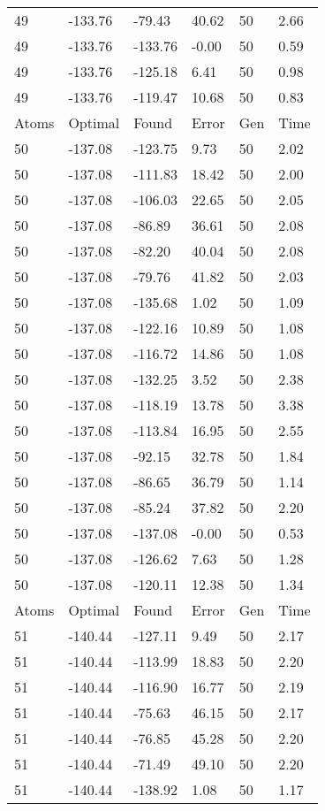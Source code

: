 \documentclass{report}
\begin{document}
\begin{appendix}
\begin{longtable}{llllll}
49 & -133.76 & -79.43 & 40.62 & 50 & 2.66 \\
49 & -133.76 & -133.76 & -0.00 & 50 & 0.59 \\
49 & -133.76 & -125.18 & 6.41 & 50 & 0.98 \\
49 & -133.76 & -119.47 & 10.68 & 50 & 0.83 \\
Atoms & Optimal & Found & Error & Gen & Time \\
50 & -137.08 & -123.75 & 9.73 & 50 & 2.02 \\
50 & -137.08 & -111.83 & 18.42 & 50 & 2.00 \\
50 & -137.08 & -106.03 & 22.65 & 50 & 2.05 \\
50 & -137.08 & -86.89 & 36.61 & 50 & 2.08 \\
50 & -137.08 & -82.20 & 40.04 & 50 & 2.08 \\
50 & -137.08 & -79.76 & 41.82 & 50 & 2.03 \\
50 & -137.08 & -135.68 & 1.02 & 50 & 1.09 \\
50 & -137.08 & -122.16 & 10.89 & 50 & 1.08 \\
50 & -137.08 & -116.72 & 14.86 & 50 & 1.08 \\
50 & -137.08 & -132.25 & 3.52 & 50 & 2.38 \\
50 & -137.08 & -118.19 & 13.78 & 50 & 3.38 \\
50 & -137.08 & -113.84 & 16.95 & 50 & 2.55 \\
50 & -137.08 & -92.15 & 32.78 & 50 & 1.84 \\
50 & -137.08 & -86.65 & 36.79 & 50 & 1.14 \\
50 & -137.08 & -85.24 & 37.82 & 50 & 2.20 \\
50 & -137.08 & -137.08 & -0.00 & 50 & 0.53 \\
50 & -137.08 & -126.62 & 7.63 & 50 & 1.28 \\
50 & -137.08 & -120.11 & 12.38 & 50 & 1.34 \\
Atoms & Optimal & Found & Error & Gen & Time \\
51 & -140.44 & -127.11 & 9.49 & 50 & 2.17 \\
51 & -140.44 & -113.99 & 18.83 & 50 & 2.20 \\
51 & -140.44 & -116.90 & 16.77 & 50 & 2.19 \\
51 & -140.44 & -75.63 & 46.15 & 50 & 2.17 \\
51 & -140.44 & -76.85 & 45.28 & 50 & 2.20 \\
51 & -140.44 & -71.49 & 49.10 & 50 & 2.20 \\
51 & -140.44 & -138.92 & 1.08 & 50 & 1.17 \\

\end{longtable}
\end{appendix}
\end{document}
